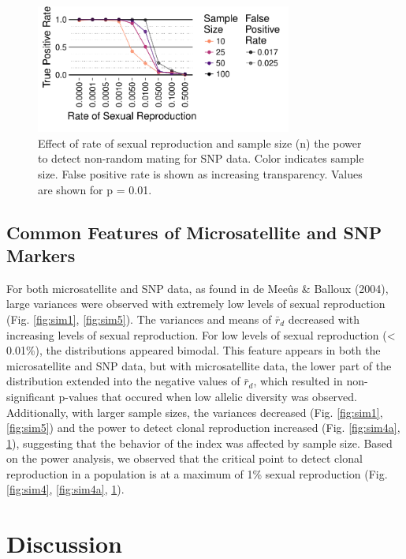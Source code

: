 \documentclass[]{article}
\theoremstyle{definition}
\theoremstyle{definition}
\theoremstyle{definition}
\theoremstyle{remark}
\begin{document}
\begin{figure}
\centering
\includegraphics[width=0.75000\textwidth]{figure/genomic_power.pdf}
\caption{Effect of rate of sexual reproduction and sample size (n) the
power to detect non-random mating for SNP data. Color indicates sample
size. False positive rate is shown as increasing transparency. Values
are shown for p = 0.01.}\label{fig:sim6}
\end{figure}

\subsection{Common Features of Microsatellite and SNP
Markers}\label{common-features-of-microsatellite-and-snp-markers}

For both microsatellite and SNP data, as found in de Meeûs \& Balloux
(2004), large variances were observed with extremely low levels of
sexual reproduction (Fig. \ref{fig:sim1}, \ref{fig:sim5}). The variances
and means of \(\bar{r}_d\) decreased with increasing levels of sexual
reproduction. For low levels of sexual reproduction (\textless{}
0.01\%), the distributions appeared bimodal. This feature appears in
both the microsatellite and SNP data, but with microsatellite data, the
lower part of the distribution extended into the negative values of
\(\bar{r}_d\), which resulted in non-significant p-values that occured
when low allelic diversity was observed. Additionally, with larger
sample sizes, the variances decreased (Fig. \ref{fig:sim1},
\ref{fig:sim5}) and the power to detect clonal reproduction increased
(Fig. \ref{fig:sim4a}, \ref{fig:sim6}), suggesting that the behavior of
the index was affected by sample size. Based on the power analysis, we
observed that the critical point to detect clonal reproduction in a
population is at a maximum of 1\% sexual reproduction (Fig.
\ref{fig:sim4}, \ref{fig:sim4a}, \ref{fig:sim6}).

\section{Discussion}\label{discussion}
\end{document}
